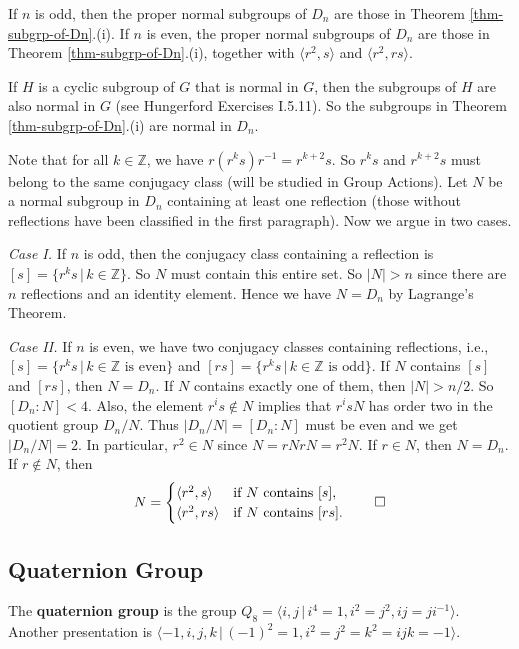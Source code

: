 \begin{theorem} \label{thm-normal-subgrp-of-Dn}
	If $n$ is odd, then the proper normal subgroups of $D_n$ are those in Theorem \ref{thm-subgrp-of-Dn}.(i). If $n$ is even, the proper normal subgroups of $D_n$ are those in Theorem \ref{thm-subgrp-of-Dn}.(i), together with $\langle r^2,s\rangle$ and $\langle r^2,rs\rangle$.
\end{theorem}
\begin{sketch}
	If $H$ is a cyclic subgroup of $G$ that is normal in $G$, then the subgroups of $H$ are also normal in $G$ (see Hungerford Exercises I.5.11). So the subgroups in Theorem \ref{thm-subgrp-of-Dn}.(i) are normal in $D_n$.
	
	Note that for all $k\in \mathbb{Z}$, we have $r(r^ks)r^{-1} = r^{k+2}s$. So $r^ks$ and $r^{k+2}s$ must belong to the same  conjugacy class (will be studied in Group Actions). Let $N$ be a normal subgroup in $D_n$ containing at least one reflection (those without reflections have been classified in the first paragraph). Now we argue in two cases.
	
	\noindent\textit{Case I.} If $n$ is odd, then the conjugacy class containing a reflection is $[s]=\{r^ks\,|\, k\in\mathbb{Z}\}$. So $N$ must contain this entire set. So $|N| > n$ since there are $n$ reflections and an identity element. Hence we have $N = D_{n}$ by Lagrange's Theorem.
	
	\noindent\textit{Case II.} If $n$ is even, we have two conjugacy classes containing reflections, i.e., $[s] = \{r^ks\,|\, k\in\mathbb{Z}\text{ is even}\}$ and $[rs] =\{r^ks\,|\, k\in\mathbb{Z}\text{ is odd}\}$. If $N$ contains $[s]$ and $[rs]$, then $N = D_n$. If $N$ contains exactly one of them, then $|N|>n/2$. So $[D_n:N] < 4$. Also, the element $r^is\not\in N$ implies that $r^isN$ has order two in the quotient group $D_n/N$. Thus $|D_n/N|=[D_n:N]$ must be even and we get $|D_n/N| = 2$. In particular, $r^2\in N$ since $N= rNrN = r^2N$. If $r\in N$, then $N = D_n$. If $r\not\in N$, then 
	\begin{equation*}
		N = \begin{cases}
			\langle r^2, s\rangle &\text{if }N\text{ contains }[s],
			\\
			\langle r^2, rs\rangle &\text{if }N\text{ contains }[rs].
		\end{cases}  \qedhere
	\end{equation*}
\end{sketch}

\subsection{Quaternion Group}
\begin{definition}
	The \textbf{quaternion group} is the group $Q_8 = \langle i,j\,|\, i^4=1, i^2=j^2, ij = ji^{-1}  \rangle$. Another presentation is $\langle -1, i,j,k\,|\, (-1)^2=1, i^2=j^2=k^2 = ijk = -1 \rangle$.
\end{definition}

